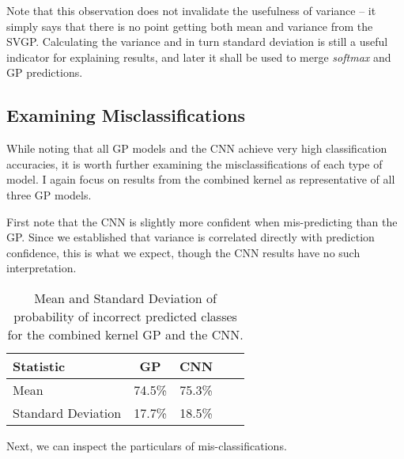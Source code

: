 \documentclass{article}
\begin{document}
Note that this observation does not invalidate the usefulness of variance -- it simply says that there is no point getting both mean and variance from the SVGP. Calculating the variance and in turn standard deviation is still a useful indicator for explaining results, and later it shall be used to merge \textit{softmax} and GP predictions.


\subsection{Examining Misclassifications}

While noting that all GP models and the CNN achieve very high classification accuracies, it is worth further examining the misclassifications of each type of model. I again focus on results from the combined kernel as representative of all three GP models.

First note that the CNN is slightly more confident when mis-predicting than the GP. Since we established that variance is correlated directly with prediction confidence, this is what we expect, though the CNN results have no such interpretation.

\begin{table}[htb]
\caption{Mean and Standard Deviation of probability of incorrect predicted classes for the combined kernel GP and the CNN.}
\label{tab:misprediction}
\vskip 0.15in
\begin{center}
\begin{small}
\begin{sc}
\begin{tabular}{lcccr}
\toprule
Statistic 			& GP 			& CNN \\
\midrule
Mean    			& 74.5\% 		& 75.3\% \\
Standard Deviation 	& 17.7\%		& 18.5\%  \\
\bottomrule
\end{tabular}
\end{sc}
\end{small}
\end{center}
\vskip -0.1in
\end{table}

Next, we can inspect the particulars of mis-classifications.
\end{document}
